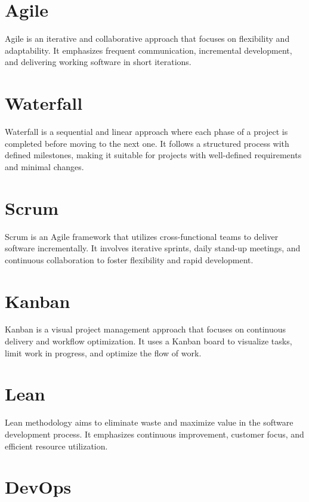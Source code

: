 \documentclass[]{report}
\begin{document}
\section{Agile}

Agile is an iterative and collaborative approach that focuses on flexibility and adaptability. It emphasizes frequent communication, incremental development, and delivering working software in short iterations.

\section{Waterfall}

Waterfall is a sequential and linear approach where each phase of a project is completed before moving to the next one. It follows a structured process with defined milestones, making it suitable for projects with well-defined requirements and minimal changes.

\section{Scrum}

Scrum is an Agile framework that utilizes cross-functional teams to deliver software incrementally. It involves iterative sprints, daily stand-up meetings, and continuous collaboration to foster flexibility and rapid development.

\section{Kanban}

Kanban is a visual project management approach that focuses on continuous delivery and workflow optimization. It uses a Kanban board to visualize tasks, limit work in progress, and optimize the flow of work.

\section{Lean}

Lean methodology aims to eliminate waste and maximize value in the software development process. It emphasizes continuous improvement, customer focus, and efficient resource utilization.

\section{DevOps}
\end{document}
